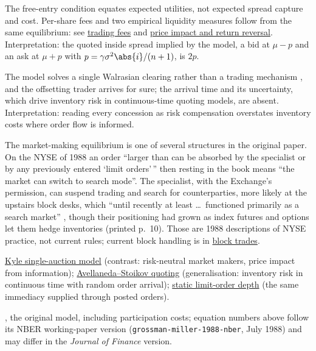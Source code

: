 \begin{qfmodel}
The free-entry condition equates expected utilities, not expected spread capture and cost. Per-share fees and two empirical liquidity measures follow from the same equilibrium: see \hyperref[res:grossman-miller-trading-fees]{trading fees} and \hyperref[res:grossman-miller-liquidity-measures]{price impact and return reversal}. Interpretation: the quoted inside spread implied by the model, a bid at $\mu-p$ and an ask at $\mu+p$ with $p=\gamma\sigma^2\abs{i}/(n+1)$, is $2p$.

 The model solves a single Walrasian clearing rather than a trading mechanism \citep[same chap., pp.~26--27]{crypto-cartea}, and the offsetting trader arrives for sure; the arrival time and its uncertainty, which drive inventory risk in continuous-time quoting models, are absent. Interpretation: reading every concession as risk compensation overstates inventory costs where order flow is informed.

The market-making equilibrium is one of several structures in the original paper. On the NYSE of 1988 an order ``larger than can be absorbed by the specialist or by any previously entered `limit orders'\,'' then resting in the book means ``the market can switch to search mode''. The specialist, with the Exchange's permission, can suspend trading and search for counterparties, more likely at the upstairs block desks, which ``until recently at least \dots\ functioned primarily as a search market'' \citep[printed p.~9]{grossman-miller-1988-nber}, though their positioning had grown as index futures and options let them hedge inventories (printed p.~10). Those are 1988 descriptions of NYSE practice, not current rules; current block handling is in \hyperref[def:block-trade]{block trades}.

 \hyperref[mod:kyle-single-auction]{Kyle single-auction model} (contrast: risk-neutral market makers, price impact from information); \hyperref[mod:avellaneda-stoikov]{Avellaneda--Stoikov quoting} (generalisation: inventory risk in continuous time with random order arrival); \hyperref[mod:static-limit-order-depth]{static limit-order depth} (the same immediacy supplied through posted orders).

 \citep{grossman-miller-1988}, the original model, including participation costs; equation numbers above follow its NBER working-paper version (\nolinkurl{grossman-miller-1988-nber}, July 1988) and may differ in the \emph{Journal of Finance} version.

\end{qfmodel}

